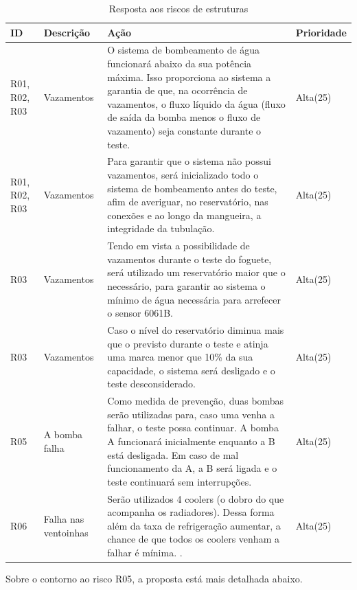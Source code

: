 \begin{table}[!h]
    \centering
    \begin{tabular}{|p{1cm}|p{2cm}|p{7cm}|p{2cm}|}
        \hline
        \textbf{ID}  & \textbf{Descrição} & \textbf{Ação} & \textbf{Prioridade} \\ \hline
        R01, R02, R03 & Vazamentos & O sistema de bombeamento de água funcionará abaixo da sua potência máxima. Isso proporciona ao sistema a garantia de que, na ocorrência de vazamentos, o fluxo líquido da água (fluxo de saída da bomba menos o fluxo de vazamento) seja constante durante o teste. & Alta(25) \\ \hline
        R01, R02, R03 & Vazamentos & Para garantir que o sistema não possui vazamentos, será inicializado todo o sistema de bombeamento antes do teste, afim de averiguar, no reservatório, nas conexões e ao longo da mangueira, a integridade da tubulação. & Alta(25) \\ \hline
        R03 & Vazamentos & Tendo em vista a possibilidade de vazamentos durante o teste do foguete, será utilizado um reservatório maior que o necessário, para garantir ao sistema o mínimo de água necessária para arrefecer o sensor 6061B. & Alta(25) \\ \hline
        R03 & Vazamentos & Caso o nível do reservatório diminua mais que o previsto durante o teste e atinja uma marca menor que 10\% da sua capacidade, o sistema será desligado e o teste desconsiderado. & Alta(25) \\ \hline        
        R05 & A bomba falha & Como medida de prevenção, duas bombas serão utilizadas para, caso uma venha a falhar, o teste possa continuar. A bomba A funcionará inicialmente enquanto a B está desligada. Em caso de mal funcionamento da A, a B será ligada e o teste continuará sem interrupções.  & Alta(25) \\ \hline
        R06 & Falha nas ventoinhas & Serão utilizados 4 coolers (o dobro do que acompanha os radiadores). Dessa forma além da taxa de refrigeração aumentar, a chance de que todos os coolers venham a falhar é mínima. . & Alta(25) \\ \hline
    \end{tabular}
\caption{Resposta aos riscos de estruturas}
\end{table}

\newpage

Sobre o contorno ao risco R05, a proposta está mais detalhada abaixo.

